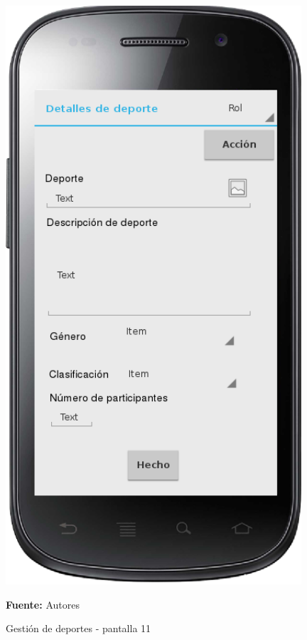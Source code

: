 \begin{figure}[!htb]
  \begin{center}
    \includegraphics[width=11cm]{./imagenes/UI/Deportes/gestion_deportes_11.png}
    \caption{Gestión de deportes - pantalla 11}
    \label{fig:gestion_deportes_11}
    \textbf{Fuente:}  Autores
  \end{center}
\end{figure}

